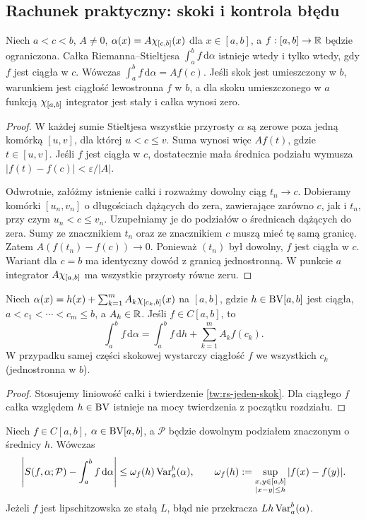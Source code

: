 \subsection*{Rachunek praktyczny: skoki i kontrola błędu}
\begin{twierdzenie}\label{tw:rs-jeden-skok}
Niech $a<c<b$, $A\ne0$, $\alpha(x)=A\chi_{[c,b]}(x)$ dla $x\in[a,b]$, a $f:[a,b]\to\mathbb R$ będzie ograniczona. Całka Riemanna--Stieltjesa $\int_a^b f\,\mathrm d\alpha$ istnieje wtedy i tylko wtedy, gdy $f$ jest ciągła w $c$. Wówczas $\int_a^b f\,\mathrm d\alpha=Af(c)$. Jeśli skok jest umieszczony w $b$, warunkiem jest ciągłość lewostronna $f$ w $b$, a dla skoku umieszczonego w $a$ funkcją $\chi_{[a,b]}$ integrator jest stały i całka wynosi zero.
\end{twierdzenie}
\begin{proof}
W każdej sumie Stieltjesa wszystkie przyrosty $\alpha$ są zerowe poza jedną komórką $[u,v]$, dla której $u<c\le v$. Suma wynosi więc $Af(t)$, gdzie $t\in[u,v]$. Jeśli $f$ jest ciągła w $c$, dostatecznie mała średnica podziału wymusza $|f(t)-f(c)|<\varepsilon/|A|$.

Odwrotnie, załóżmy istnienie całki i rozważmy dowolny ciąg $t_n\to c$. Dobieramy komórki $[u_n,v_n]$ o długościach dążących do zera, zawierające zarówno $c$, jak i $t_n$, przy czym $u_n<c\le v_n$. Uzupełniamy je do podziałów o średnicach dążących do zera. Sumy ze znacznikiem $t_n$ oraz ze znacznikiem $c$ muszą mieć tę samą granicę. Zatem $A(f(t_n)-f(c))\to0$. Ponieważ $(t_n)$ był dowolny, $f$ jest ciągła w $c$. Wariant dla $c=b$ ma identyczny dowód z granicą jednostronną. W punkcie $a$ integrator $A\chi_{[a,b]}$ ma wszystkie przyrosty równe zeru.
\end{proof}
\begin{wniosek}\label{wn:rs-suma-skokow}
Niech $\alpha(x)=h(x)+\sum_{k=1}^m A_k\chi_{[c_k,b]}(x)$ na $[a,b]$, gdzie $h\in\mathrm{BV}[a,b]$ jest ciągła, $a<c_1<\cdots<c_m\le b$, a $A_k\in\mathbb R$. Jeśli $f\in C[a,b]$, to
\[
\int_a^b f\,\mathrm d\alpha=\int_a^b f\,\mathrm dh+\sum_{k=1}^m A_kf(c_k).
\]
W przypadku samej części skokowej wystarczy ciągłość $f$ we wszystkich $c_k$ (jednostronna w $b$).
\end{wniosek}
\begin{proof}
Stosujemy liniowość całki i twierdzenie \ref{tw:rs-jeden-skok}. Dla ciągłego $f$ całka względem $h\in\mathrm{BV}$ istnieje na mocy twierdzenia z początku rozdziału.
\end{proof}
\begin{twierdzenie}\label{tw:rs-blad-kwadratury}
Niech $f\in C[a,b]$, $\alpha\in\mathrm{BV}[a,b]$, a $\mathcal P$ będzie dowolnym podziałem znaczonym o średnicy $h$. Wówczas
\[
\left|S(f,\alpha;\mathcal P)-\int_a^b f\,\mathrm d\alpha\right|
\le \omega_f(h)\operatorname{Var}_a^b(\alpha),
\qquad
\omega_f(h):=\sup_{\substack{x,y\in[a,b]\\|x-y|\le h}}|f(x)-f(y)|.
\]
Jeżeli $f$ jest lipschitzowska ze stałą $L$, błąd nie przekracza $Lh\operatorname{Var}_a^b(\alpha)$.
\end{twierdzenie}
